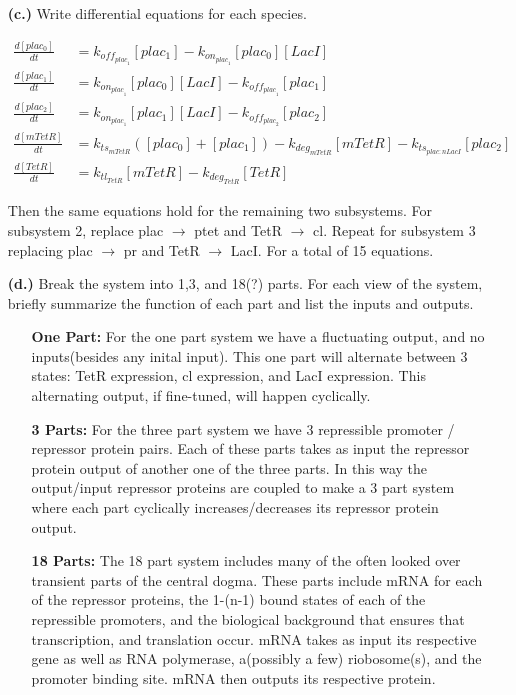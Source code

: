 \documentclass[11pt]{article}
\begin{document}
\begin{itemize}

\item[{\bf (c.)}] Write differential equations for each species.

  \begin{equation*}
    \begin{align}
    \frac{d[plac_0]}{dt} &= 
    k_{off_{{plac}_1}}[plac_1] - k_{on_{{plac}_1}}[plac_0][LacI] \\
    \frac{d[plac_1]}{dt} &= 
    k_{on_{{plac}_1}}[plac_0][LacI] - k_{off_{{plac}_1}}[plac_1]\\
    \frac{d[plac_2]}{dt} &= 
    k_{on_{{plac}_1}}[plac_1][LacI] - k_{off_{{plac}_2}}[plac_2]\\
      \frac{d[mTetR]}{dt} &= k_{ts_{mTetR}}([plac_0]+[plac_1]) - k_{deg_{mTetR}}[mTetR]- k_{ts_{plac:nLacI}}[plac_2] \\
      \frac{d[TetR]}{dt} &= k_{{tl}_{TetR}}[mTetR] - k_{deg_{TetR}}[TetR]
    \end{align}
  \end{equation*}

Then the same equations hold for the remaining two subsystems. For subsystem 2, replace plac $\rightarrow$ ptet and TetR $\rightarrow$ cl. Repeat for subsystem 3 replacing plac $\rightarrow$ pr and TetR $\rightarrow$ LacI. For a total of 15 equations.
\item[{\bf (d.)}] Break the system into 1,3, and 18(?) parts. For each view of the system, briefly summarize the function of each part and list the inputs and outputs.

  \begin{itemize}
    \item[{\bf One Part:}] For the one part system we have a fluctuating output, and no inputs(besides any inital input). This one part will alternate between 3 states: TetR expression, cl expression, and LacI expression.
 This alternating output, if fine-tuned, will happen cyclically. 
   \item[{\bf 3 Parts:}] For the three part system we have 3 repressible promoter / repressor protein pairs. 
Each of these parts takes as input the repressor protein output of another one of the three parts. In this way the output/input repressor proteins are coupled to make a 3 part system where each part cyclically increases/decreases its repressor protein output.
   \item[{\bf 18 Parts:}] The 18 part system includes many of the often looked over transient parts of the central dogma. These parts include mRNA for each of the repressor proteins, the 1-(n-1) bound states of each of the repressible promoters, and the biological background that ensures that transcription, and translation occur.
mRNA takes as input its respective gene as well as RNA polymerase, a(possibly a few) riobosome(s), and the promoter binding site. mRNA then outputs its respective protein. 


\end{itemize}
\end{itemize}
\end{document}
